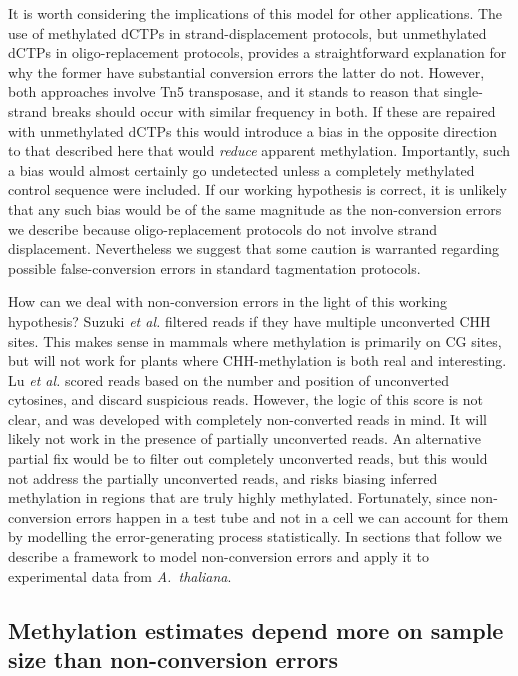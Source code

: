 \documentclass[10pt,letterpaper]{article}
\begin{document}
It is worth considering the implications of this model for other applications.
The use of methylated dCTPs in strand-displacement protocols, but unmethylated dCTPs in oligo-replacement protocols, provides a straightforward explanation for why the former have substantial conversion errors the latter do not.
However, both approaches involve Tn5 transposase, and it stands to reason that single-strand breaks should occur with similar frequency in both.
If these are repaired with unmethylated dCTPs this would introduce a bias in the opposite direction to that described here that would \textit{reduce} apparent methylation.
Importantly, such a bias would almost certainly go undetected unless a completely methylated control sequence were included.
If our working hypothesis is correct, it is unlikely that any such bias would be of the same magnitude as the non-conversion errors we describe because oligo-replacement protocols do not involve strand displacement.
Nevertheless we suggest that some caution is warranted regarding possible false-conversion errors in standard tagmentation protocols.

How can we deal with non-conversion errors in the light of this working hypothesis?
Suzuki \textit{et al.}\cite{suzuki2018whole} filtered reads if they have multiple unconverted CHH sites.
This makes sense in mammals where methylation is primarily on CG sites, but will not work for plants where CHH-methylation is both real and interesting.
Lu \textit{et al.} \cite{lu2015improved} scored reads based on the number and position of unconverted cytosines, and discard suspicious reads.
However, the logic of this score is not clear, and was developed with completely non-converted reads in mind.
It will likely not work in the presence of partially unconverted reads.
An alternative partial fix would be to filter out completely unconverted reads, but this would not address the partially unconverted reads, and risks biasing inferred methylation in regions that are truly highly methylated.
Fortunately, since non-conversion errors happen in a test tube and not in a cell we can account for them by modelling the error-generating process statistically.
In sections that follow we describe a framework to model non-conversion errors and apply it to experimental data from \emph{A.~thaliana}.

\subsection*{Methylation estimates depend more on sample size than non-conversion errors}
\end{document}

